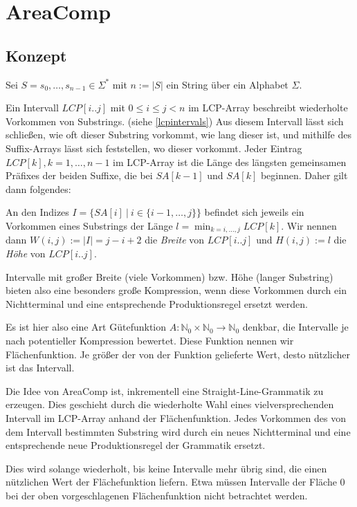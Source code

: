 \chapter{AreaComp}
\label{areacomp}

\section{Konzept}
\label{areacompconcept}

Sei $S = s_0, \dots, s_{n-1} \in \Sigma^*$ mit $n := |S|$ ein String über ein Alphabet $\Sigma$.

Ein Intervall $LCP[i..j]$ mit $0 \leq i \leq j < n$ im LCP-Array beschreibt wiederholte Vorkommen von Substrings. (siehe \autoref{lcpintervals}) Aus diesem Intervall lässt sich schließen, wie oft dieser Substring vorkommt, wie lang dieser ist, und mithilfe des Suffix-Arrays lässt sich feststellen, wo dieser vorkommt. Jeder Eintrag $LCP[k], k = 1,\dots,n-1$ im LCP-Array ist die Länge des längsten gemeinsamen Präfixes der beiden Suffixe, die bei $SA[k-1]$ und $SA[k]$ beginnen. Daher gilt dann folgendes:

An den Indizes $I = \{SA[i]\ |\ i \in \{i-1, \dots, j\}\}$ befindet sich jeweils ein Vorkommen eines Substrings der Länge $l = \min_{k = i, \dots, j} LCP[k]$. Wir nennen dann $W(i, j) := |I| = j - i + 2$ die \emph{Breite} von $LCP[i..j]$ und $H(i, j) := l$ die \emph{Höhe} von $LCP[i..j]$.

Intervalle mit großer Breite (viele Vorkommen) bzw. Höhe (langer Substring) bieten also eine besonders große Kompression, wenn diese Vorkommen durch ein Nichtterminal und eine entsprechende Produktionsregel ersetzt werden.

Es ist hier also eine Art Gütefunktion $A: \mathbb{N}_0 \times \mathbb{N}_0 \rightarrow \mathbb{N}_0$ denkbar, die Intervalle je nach potentieller Kompression bewertet. Diese Funktion nennen wir Flächenfunktion. Je größer der von der Funktion gelieferte Wert, desto nützlicher ist das Intervall.

Die Idee von AreaComp ist, inkrementell eine Straight-Line-Grammatik zu erzeugen. Dies geschieht durch die wiederholte Wahl eines vielversprechenden Intervall im LCP-Array anhand der Flächenfunktion. Jedes Vorkommen des von dem Intervall bestimmten Substring wird durch ein neues Nichtterminal und eine entsprechende neue Produktionsregel der Grammatik ersetzt.

Dies wird solange wiederholt, bis keine Intervalle mehr übrig sind, die einen nützlichen Wert der Flächefunktion liefern. Etwa müssen Intervalle der Fläche $0$ bei der oben vorgeschlagenen Flächenfunktion nicht betrachtet werden.

